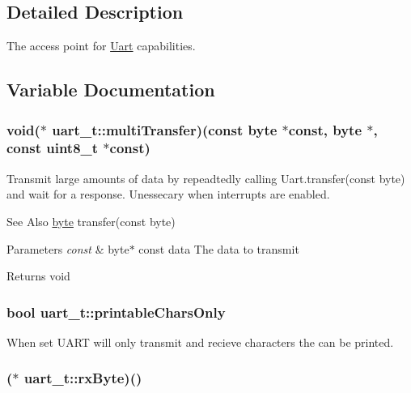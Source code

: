 \subsection{Detailed Description}
The access point for \hyperlink{a00009}{Uart} capabilities. 

\subsection{Variable Documentation}
\hypertarget{a00018_ga10aaaa60575c35598ae7033beafb5828}{
\subsubsection[{multi\-Transfer}]{\setlength{\rightskip}{0pt plus 5cm}void($\ast$ uart\-\_\-t\-::multi\-Transfer)(const {\bf byte} $\ast$const, {\bf byte} $\ast$, const uint8\-\_\-t $\ast$const)}}\label{a00018_ga10aaaa60575c35598ae7033beafb5828}


Transmit large amounts of data by repeadtedly calling Uart.\-transfer(const byte) and wait for a response. Unessecary when interrupts are enabled. 

\begin{DoxySeeAlso}{See Also}
\hyperlink{a00011_a82b52bf2b45e214a8f2100ebfdf1aee4}{byte} transfer(const byte) 
\end{DoxySeeAlso}

\begin{DoxyParams}{Parameters}
{\em const} & byte$\ast$ const data The data to transmit \\
\hline
\end{DoxyParams}
\begin{DoxyReturn}{Returns}
void 
\end{DoxyReturn}
\hypertarget{a00018_ga715d9d9174c62b5682150875555dac96}{
\subsubsection[{printable\-Chars\-Only}]{\setlength{\rightskip}{0pt plus 5cm}bool uart\-\_\-t\-::printable\-Chars\-Only}}\label{a00018_ga715d9d9174c62b5682150875555dac96}


When set U\-A\-R\-T will only transmit and recieve characters the can be printed. 

\hypertarget{a00018_ga114e9fef74ba99e9a09f89ed6d12da17}{
\subsubsection[{rx\-Byte}]{($\ast$ uart\-\_\-t\-::rx\-Byte)()}}\label{a00018_ga114e9fef74ba99e9a09f89ed6d12da17}


